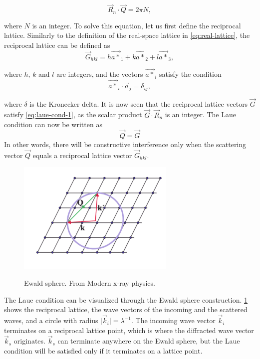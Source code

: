 \begin{equation}
\label{eq:laue-cond-1}
\vec{R}_n \cdot \vec{Q} = 2 \pi N,
\end{equation}

where $N$ is an integer. To solve this equation, let us first define the reciprocal lattice. Similarly to the definition of the real-space lattice in \cref{eq:real-lattice}, the reciprocal lattice can be defined as
\begin{equation}
\vec{G}_{hkl} = h \vec{a*}_1 + k \vec{a*}_2 + l \vec{a*}_3,
\end{equation}

where $h$, $k$ and $l$ are integers, and the vectors $\vec{a*}_i$ satisfy the condition
\begin{equation*}
\vec{a*}_i \cdot \vec{a}_j = \delta_{ij},
\end{equation*}

where $\delta$ is the Kronecker delta. It is now seen that the reciprocal lattice vectors $\vec{G}$ satisfy \cref{eq:laue-cond-1}, as the scalar product $\vec{G} \cdot \vec{R}_n$ is an integer. The Laue condition can now be written as
\begin{equation}
\vec{Q} = \vec{G}
\end{equation}
In other words, there will be constructive interference only when the scattering vector $\vec{Q}$ equals a reciprocal lattice vector $\vec{G}_{hkl}$.

\begin{figure}
	\centering
	\includegraphics[width=.7\linewidth]{fig/other/ewald-sphere}
	\label{fig:ewald-sphere}
	\caption{Ewald sphere. From Modern x-ray physics.}
\end{figure}

The Laue condition can be visualized through the Ewald sphere construction. \cref{fig:ewald-sphere} shows the reciprocal lattice, the wave vectors of the incoming and the scattered waves, and a circle with radius $\vert \vec{k}_i \vert = \lambda^{-1}$. The incoming wave vector $\vec{k}_i$ terminates on a reciprocal lattice point, which is where the diffracted wave vector $\vec{k}_s$ originates. $\vec{k}_s$ can terminate anywhere on the Ewald sphere, but the Laue condition will be satisfied only if it terminates on a lattice point. 



